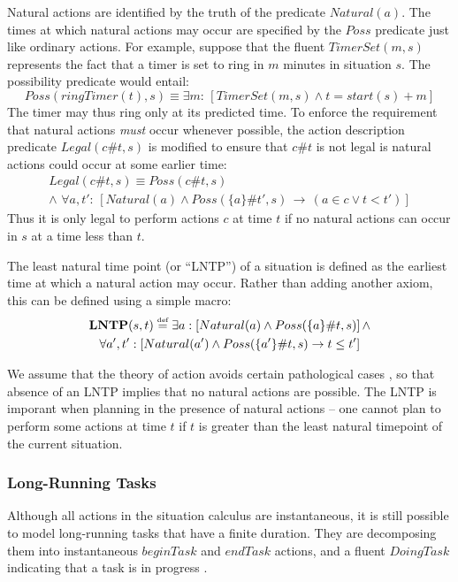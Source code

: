 Natural actions are identified by the truth of the predicate $Natural(a)$.
The times at which natural actions may occur are specified by the
$Poss$ predicate just like ordinary actions. For example, suppose
that the fluent $TimerSet(m,s)$ represents the fact that a timer
is set to ring in $m$ minutes in situation $s$. The possibility
predicate would entail:\[
Poss(ringTimer(t),s)\equiv\exists m:\,\left[TimerSet(m,s)\wedge t=start(s)+m\right]\]
 The timer may thus ring only at its predicted time. To enforce the
requirement that natural actions \emph{must} occur whenever possible,
the action description predicate $Legal(c\#t,s)$ is modified to ensure
that $c\#t$ is not legal is natural actions could occur at some earlier
time:\begin{multline*}
Legal(c\#t,s)\equiv Poss(c\#t,s)\\
\wedge\,\,\forall a,t':\,\left[Natural(a)\wedge Poss(\{a\}\#t',s)\,\rightarrow\,\left(a\in c\vee t<t'\right)\right]\end{multline*}
 Thus it is only legal to perform actions $c$ at time $t$ if no
natural actions can occur in $s$ at a time less than $t$.

The least natural time point (or {}``LNTP'') of a situation is defined
as the earliest time at which a natural action may occur. Rather than
adding another axiom, this can be defined using a simple macro: \begin{multline*}
\mathbf{LNTP}(s,t)\stackrel{\mbox{\tiny def}}{=}\exists a:\left[Natural(a)\wedge Poss(\{a\}\#t,s)\right]\wedge\\
\forall a',t':\left[Natural(a')\wedge Poss(\{a'\}\#t,s)\rightarrow t\leq t'\right]\end{multline*}


We assume that the theory of action avoids certain pathological cases
\citep{reiter01kia}, so that absence of an LNTP implies that no natural
actions are possible. The LNTP is imporant when planning in the presence
of natural actions -- one cannot plan to perform some actions at time
$t$ if $t$ is greater than the least natural timepoint of the current
situation.


\subsubsection{Long-Running Tasks}

Although all actions in the situation calculus are instantaneous,
it is still possible to model long-running tasks that have a finite
duration. They are decomposing them into instantaneous $beginTask$
and $endTask$ actions, and a fluent $DoingTask$ indicating that
a task is in progress \citep{pinto94temporal}.


